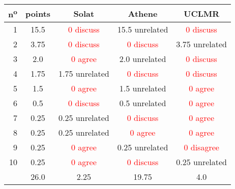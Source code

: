 \begin{center}
 \begin{tabular}{ r | c || c c c }
  n\textsuperscript{o} & points & Solat                      & Athene                     & UCLMR                       \\ \hline
  1                    & 15.5   & \textcolor{red}{0 discuss} & 15.5 unrelated             & \textcolor{red}{0 discuss}  \\
  2                    & 3.75   & \textcolor{red}{0 discuss} & \textcolor{red}{0 discuss} & 3.75 unrelated              \\
  3                    & 2.0    & \textcolor{red}{0 agree}   & 2.0 unrelated              & \textcolor{red}{0 discuss}  \\
  4                    & 1.75   & 1.75 unrelated             & \textcolor{red}{0 discuss} & \textcolor{red}{0 discuss}  \\
  5                    & 1.5    & \textcolor{red}{0 agree}   & 1.5 unrelated              & \textcolor{red}{0 agree}    \\
  6                    & 0.5    & \textcolor{red}{0 discuss} & 0.5 unrelated              & \textcolor{red}{0 agree}    \\
  7                    & 0.25   & 0.25 unrelated             & \textcolor{red}{0 discuss} & \textcolor{red}{0 agree}    \\
  8                    & 0.25   & 0.25 unrelated             & \textcolor{red}{0 agree}   & \textcolor{red}{0 agree}    \\
  9                    & 0.25   & \textcolor{red}{0 agree}   & 0.25 unrelated             & \textcolor{red}{0 disagree} \\
  10                   & 0.25   & \textcolor{red}{0 agree}   & \textcolor{red}{0 discuss} & 0.25 unrelated              \\ \hline
                       & 26.0   & 2.25                       & 19.75                      & 4.0                         \\
 \end{tabular}
\end{center}
